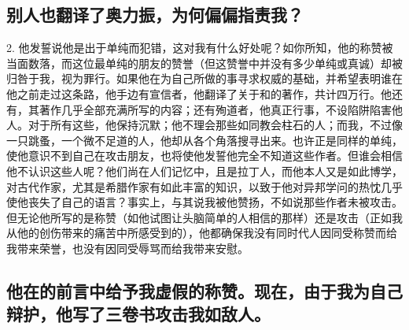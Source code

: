 \subsection{别人也翻译了奥力振，为何偏偏指责我？}

2. 他发誓说他是出于单纯而犯错，这对我有什么好处呢？如你所知，他的称赞被当面数落，而这位最单纯的朋友的赞誉（但这赞誉中并没有多少单纯或真诚）却被归咎于我，视为罪行。如果他在为自己所做的事寻求权威的基础，并希望表明谁在他之前走过这条路，他手边有宣信者，他翻译了关于和的著作，共计四万行。他还有，其著作几乎全部充满所写的内容；还有殉道者，他真正行事，不设陷阱陷害他人。对于所有这些，他保持沉默；他不理会那些如同教会柱石的人；而我，不过像一只跳蚤，一个微不足道的人，他却从各个角落搜寻出来。也许正是同样的单纯，使他意识不到自己在攻击朋友，也将使他发誓他完全不知道这些作者。但谁会相信他不认识这些人呢？他们尚在人们记忆中，且是拉丁人，而他本人又是如此博学，对古代作家，尤其是希腊作家有如此丰富的知识，以致于他对异邦学问的热忱几乎使他丧失了自己的语言？事实上，与其说我被他赞扬，不如说那些作者未被攻击。但无论他所写的是称赞（如他试图让头脑简单的人相信的那样）还是攻击（正如我从他的创伤带来的痛苦中所感受到的），他都确保我没有同时代人因同受称赞而给我带来荣誉，也没有因同受辱骂而给我带来安慰。\par


\subsection{他在的前言中给予我虚假的称赞。现在，由于我为自己辩护，他写了三卷书攻击我如敌人。}

